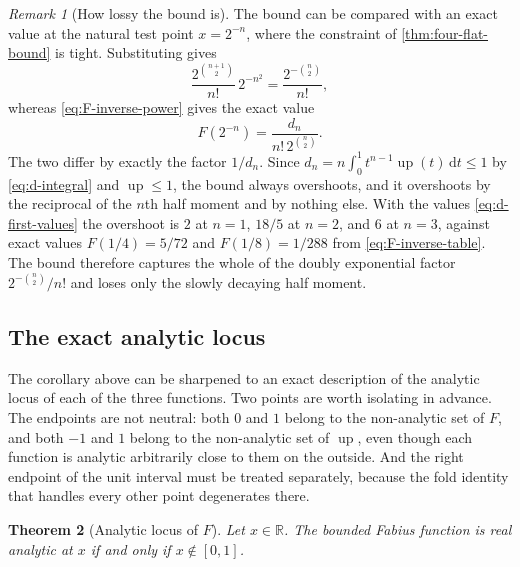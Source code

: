 \documentclass[11pt,oneside]{article}
\newtheorem{theorem}{Theorem}[section]
\theoremstyle{definition}
\theoremstyle{remark}
\newtheorem{remark}[theorem]{Remark}
\newcommand{\R}{\mathbb R}
\newcommand{\Up}{\operatorname{up}}
\newcommand{\dd}{\,\mathrm d}
\begin{document}
\begin{remark}[How lossy the bound is]
\label{rem:four-bound-sharpness}
The bound can be compared with an exact value at the natural test point $x=2^{-n}$, where
the constraint of \cref{thm:four-flat-bound} is tight.  Substituting gives
\begin{equation}
 \frac{2^{\binom{n+1}{2}}}{n!}\,2^{-n^2}
 =\frac{2^{-\binom n2}}{n!},                              \label{eq:four-bound-at-dyadic}
\end{equation}
whereas \eqref{eq:F-inverse-power} gives the exact value
\begin{equation*}
 F(2^{-n})=\frac{d_n}{n!\,2^{\binom n2}} .
\end{equation*}
The two differ by exactly the factor $1/d_n$.  Since
$d_n=n\int_0^1t^{n-1}\Up(t)\dd t\le1$ by \eqref{eq:d-integral} and $\Up\le1$, the bound
always overshoots, and it overshoots by the reciprocal of the $n$th half moment and by
nothing else.  With the values \eqref{eq:d-first-values} the overshoot is $2$ at $n=1$,
$18/5$ at $n=2$, and $6$ at $n=3$, against exact values $F(1/4)=5/72$ and $F(1/8)=1/288$
from \eqref{eq:F-inverse-table}.  The bound therefore captures the whole of the doubly
exponential factor $2^{-\binom n2}/n!$ and loses only the slowly decaying half moment.
\end{remark}

\subsection{The exact analytic locus}
\label{shape:analytic-locus}

The corollary above can be sharpened to an exact description of the analytic locus of each of
the three functions.  Two points are worth isolating in advance.  The endpoints are not
neutral: both $0$ and $1$ belong to the non-analytic set of $F$, and both $-1$ and $1$ belong
to the non-analytic set of $\Up$, even though each function is analytic arbitrarily close to
them on the outside.  And the right endpoint of the unit interval must be treated separately,
because the fold identity that handles every other point degenerates there.

\begin{theorem}[Analytic locus of $F$]
\label{thm:shape-analytic-locus-F}
Let $x\in\R$.  The bounded Fabius function is real analytic at $x$ if and only if
$x\notin[0,1]$.
\end{theorem}
\end{document}
